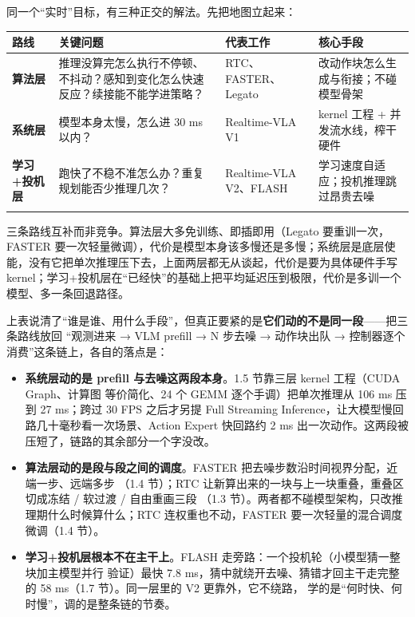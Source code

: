 \documentclass[
  chinese,
]{ctexart}
\providecommand{\tightlist}{%
  \setlength{\itemsep}{0pt}\setlength{\parskip}{0pt}}
\begin{document}
同一个``实时''目标，有三种正交的解法。先把地图立起来：

\begin{center}
\begin{tabular}{@{}>{\raggedright\arraybackslash}p{} >{\raggedright\arraybackslash}p{} >{\raggedright\arraybackslash}p{} >{\raggedright\arraybackslash}p{}@{}}
\toprule\noalign{}
路线 & 关键问题 & 代表工作 & 核心手段 \\
\midrule\noalign{}
\textbf{算法层} & 推理没算完怎么执行不停顿、不抖动？感知到变化怎么快速反应？续接能不能学进策略？ & RTC、FASTER、Legato & 改动作块怎么生成与衔接；不碰模型骨架 \\
\textbf{系统层} & 模型本身太慢，怎么进 30 ms 以内？ & Realtime-VLA V1 & kernel 工程 + 并发流水线，榨干硬件 \\
\textbf{学习+投机层} & 跑快了不稳不准怎么办？重复规划能否少推理几次？ & Realtime-VLA V2、FLASH & 学习速度自适应；投机推理跳过昂贵去噪 \\
\bottomrule\noalign{}
\end{tabular}
\end{center}

三条路线互补而非竞争。算法层大多免训练、即插即用（Legato
要重训一次，FASTER
要一次轻量微调），代价是模型本身该多慢还是多慢；系统层是底层使能，没有它把单次推理压下去，上面两层都无从谈起，代价是要为具体硬件手写
kernel；学习+投机层在``已经快''的基础上把平均延迟压到极限，代价是多训一个模型、多一条回退路径。

上表说清了``谁是谁、用什么手段''，但真正要紧的是\textbf{它们动的不是同一段}------把三条路线放回
``观测进来 → VLM prefill → N 步去噪 → 动作块出队 →
控制器逐个消费''这条链上，各自的落点是：

\begin{itemize}
\tightlist
\item
  \textbf{系统层动的是 prefill 与去噪这两段本身}。1.5 节靠三层 kernel
  工程（CUDA Graph、计算图 等价简化、24 个 GEMM 逐个手调）把单次推理从
  106 ms 压到 27 ms；跨过 30 FPS 之后才另提 Full Streaming
  Inference，让大模型慢回路几十毫秒看一次场景、Action Expert 快回路约 2
  ms 出一次动作。这两段被压短了，链路的其余部分一个字没改。
\item
  \textbf{算法层动的是段与段之间的调度}。FASTER
  把去噪步数沿时间视界分配，近端一步、远端多步 （1.4 节）；RTC
  让新算出来的一块与上一块重叠，重叠区切成冻结 / 软过渡 / 自由重画三段
  （1.3 节）。两者都不碰模型架构，只改推理期什么时候算什么；RTC
  连权重也不动，FASTER 要一次轻量的混合调度微调（1.4 节）。
\item
  \textbf{学习+投机层根本不在主干上}。FLASH
  走旁路：一个投机轮（小模型猜一整块加主模型并行 验证）最快 7.8
  ms，猜中就绕开去噪、猜错才回主干走完整的 58 ms（1.7 节）。同一层里的
  V2 更靠外，它不绕路， 学的是``何时快、何时慢''，调的是整条链的节奏。
\end{itemize}
\end{document}
